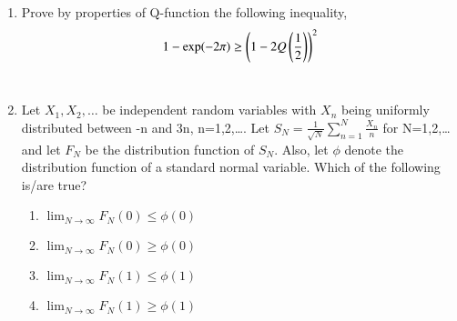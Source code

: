 \renewcommand{\theequation}{\theenumi}
\renewcommand{\thefigure}{\theenumi}
\renewcommand{\thetable}{\theenumi}
\begin{enumerate}[label=\thesection.\arabic*.,ref=\thesection.\theenumi]

\item  Prove by properties of Q-function the following inequality,
$$1-\exp(-2 \pi) \geq \left(1-2Q\left(\dfrac{1}{2}\right)\right)^2$$
\\
\solution

\item Let $X_1,X_2,\dots$ be independent random variables with $X_n$ being uniformly distributed between -n and 3n, n=1,2,\dots. 
Let $S_N = \frac{1}{\sqrt{N}} \sum_{n=1}^N \frac{X_n}{n}$ for N=1,2,\dots and let $F_N$ be the distribution function of $S_N$. Also, let $\phi$ denote the distribution function of a standard normal variable. Which of the following is/are true? 
\begin{enumerate}[label=\Alph*)]
    \item $\lim_{N\to\infty} F_N(0)\leq \phi(0)$
    \item $\lim_{N\to\infty} F_N(0)\geq \phi(0)$
    \item $\lim_{N\to\infty} F_N(1)\leq \phi(1)$
    \item $\lim_{N\to\infty} F_N(1)\geq \phi(1)$
\end{enumerate}
\solution



\end{enumerate}
